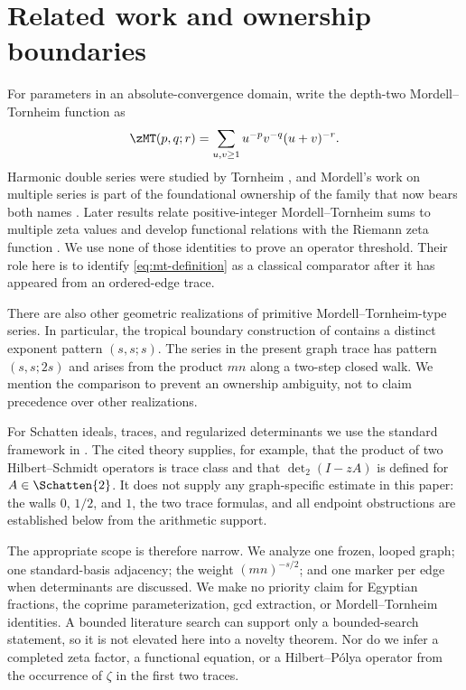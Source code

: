 \section{Related work and ownership boundaries}
\label{sec:related-work}

For parameters in an absolute-convergence domain, write the depth-two
Mordell--Tornheim function as
\begin{equation}
  \zMT(p,q;r)
  =\sum_{u,v\geq1}u^{-p}v^{-q}(u+v)^{-r}.
  \label{eq:mt-definition}
\end{equation}
Harmonic double series were studied by Tornheim
\citep{Tornheim1950}, and Mordell's work on multiple series is part of the
foundational ownership of the family that now bears both names
\citep{Mordell1958}.  Later results relate positive-integer
Mordell--Tornheim sums to multiple zeta values
\citep{BradleyZhou2012} and develop functional relations with the Riemann
zeta function \citep{Tsumura2007}.  We use none of those identities to
prove an operator threshold.  Their role here is to identify
\eqref{eq:mt-definition} as a classical comparator after it has appeared
from an ordered-edge trace.

There are also other geometric realizations of primitive
Mordell--Tornheim-type series.  In particular, the tropical boundary
construction of \citet{KalininLupercioShkolnikov2026} contains a distinct
exponent pattern $(s,s;s)$.  The series in the present graph trace has
pattern $(s,s;2s)$ and arises from the product $mn$ along a two-step closed
walk.  We mention the comparison to prevent an ownership ambiguity, not to
claim precedence over other realizations.

For Schatten ideals, traces, and regularized determinants we use the
standard framework in \citet{Simon2005}.  The cited theory supplies, for
example, that the product of two Hilbert--Schmidt operators is trace class
and that $\det_2(I-zA)$ is defined for $A\in\Schatten{2}$.  It does not
supply any graph-specific estimate in this paper: the walls
$0$, $1/2$, and $1$, the two trace formulas, and all endpoint obstructions
are established below from the arithmetic support.

The appropriate scope is therefore narrow.  We analyze one frozen, looped
graph; one standard-basis adjacency; the weight $(mn)^{-s/2}$; and one
marker per edge when determinants are discussed.  We make no priority
claim for Egyptian fractions, the coprime parameterization, gcd extraction,
or Mordell--Tornheim identities.  A bounded literature search can support
only a bounded-search statement, so it is not elevated here into a novelty
theorem.  Nor do we infer a completed zeta factor, a functional equation,
or a Hilbert--P\'olya operator from the occurrence of $\zeta$ in the first
two traces.

